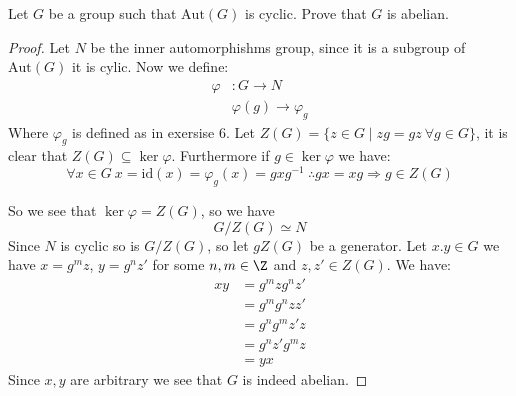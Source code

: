 \begin{exercise}
Let $G$ be a group such that $\text{Aut}(G)$ is cyclic. Prove that $G$ is abelian.
\begin{proof}
Let $N$ be the inner automorphishms group, since it is a subgroup of $\text{Aut}(G)$ it is cylic. Now we define:\begin{align*}
\varphi &\colon G\rightarrow N\\
&\varphi(g)\rightarrow \varphi_g
\end{align*}
Where $\varphi_g$ is defined as in exersise $6$. Let $Z(G) = \{z\in G \mid zg = gz \ \forall g\in G\}$, it is clear that $Z(G)\subseteq \ker \varphi$. Furthermore if $g\in \ker\varphi$ we have:\begin{equation*}
\forall x\in G \ x = \text{id}(x) = \varphi_g(x) = gxg^{-1} \ \therefore gx = xg \Rightarrow g\in Z(G)
\end{equation*}

So we see that $\ker\varphi = Z(G)$, so we have \[G/Z(G)\simeq N\]
Since $N$ is cyclic so is $G/Z(G)$, so let $gZ(G)$ be a generator. Let $x.y\in G$ we have $x = {g^m}z$, $y = {g^n}z'$ for some $n,m\in \Z$ and $z,z'\in Z(G)$. We have:\begin{align*}
xy &= {g^m}z{g^n}z'\\
&= {g^m}{g^n}zz'\\
&= {g^n}{g^m}z'z\\
&=  {g^n}z'{g^m}z\\
&= yx
\end{align*}
Since $x,y$ are arbitrary we see that $G$ is indeed abelian.
\end{proof}
\end{exercise}

